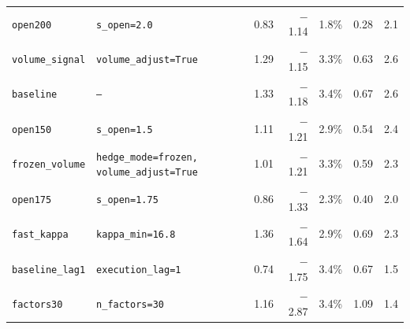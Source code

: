 \begin{longtable}{@{}l>{\raggedright\arraybackslash\footnotesize}p{4.4cm}rrrrr@{}}
\texttt{open200} & \texttt{s\_open=2.0} & 0.83 & \ensuremath{-}1.14 & 1.8\% & 0.28 & 2.1\\
\texttt{volume\_signal} & \texttt{volume\_adjust=True} & 1.29 & \ensuremath{-}1.15 & 3.3\% & 0.63 & 2.6\\
\texttt{baseline} & \texttt{--} & 1.33 & \ensuremath{-}1.18 & 3.4\% & 0.67 & 2.6\\
\texttt{open150} & \texttt{s\_open=1.5} & 1.11 & \ensuremath{-}1.21 & 2.9\% & 0.54 & 2.4\\
\texttt{frozen\_volume} & \texttt{hedge\_mode=frozen, volume\_adjust=True} & 1.01 & \ensuremath{-}1.21 & 3.3\% & 0.59 & 2.3\\
\texttt{open175} & \texttt{s\_open=1.75} & 0.86 & \ensuremath{-}1.33 & 2.3\% & 0.40 & 2.0\\
\texttt{fast\_kappa} & \texttt{kappa\_min=16.8} & 1.36 & \ensuremath{-}1.64 & 2.9\% & 0.69 & 2.3\\
\texttt{baseline\_lag1} & \texttt{execution\_lag=1} & 0.74 & \ensuremath{-}1.75 & 3.4\% & 0.67 & 1.5\\
\texttt{factors30} & \texttt{n\_factors=30} & 1.16 & \ensuremath{-}2.87 & 3.4\% & 1.09 & 1.4\\
\bottomrule
\end{longtable}
